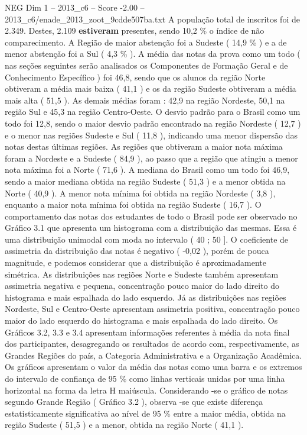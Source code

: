 \begin{textsample}{NEG Dim 1 – 2013\_c6 – Score -2.00 – 2013\_c6/enade\_2013\_zoot\_9cdde507ba.txt}
A população total de inscritos foi de 2.349.
Destes, 2.109 \textbf{estiveram} presentes, sendo 10,2 \% o índice de não comparecimento.
A Região de maior abstenção foi a Sudeste ( 14,9 \% ) e a de menor abstenção foi a Sul ( 4,3 \% ).
A média das notas da prova como um todo ( nas seções seguintes serão analisados os Componentes de Formação Geral e de Conhecimento Específico ) foi 46,8, sendo que os alunos da região Norte obtiveram a média mais baixa ( 41,1 ) e os da região Sudeste obtiveram a média mais alta ( 51,5 ).
As demais médias foram : 42,9 na região Nordeste, 50,1 na região Sul e 45,3 na região Centro-Oeste.
O desvio padrão para o Brasil como um todo foi 12,8, sendo o maior desvio padrão encontrado na região Nordeste ( 12,7 ) e o menor nas regiões Sudeste e Sul ( 11,8 ), indicando uma menor dispersão das notas destas últimas regiões.
As regiões que obtiveram a maior nota máxima foram a Nordeste e a Sudeste ( 84,9 ), ao passo que a região que atingiu a menor nota máxima foi a Norte ( 71,6 ).
A mediana do Brasil como um todo foi 46,9, sendo a maior mediana obtida na região Sudeste ( 51,3 ) e a menor obtida na Norte ( 40,9 ).
A menor nota mínima foi obtida na região Nordeste ( 3,8 ), enquanto a maior nota mínima foi obtida na região Sudeste ( 16,7 ).
O comportamento das notas dos estudantes de todo o Brasil pode ser observado no Gráfico 3.1 que apresenta um histograma com a distribuição das mesmas.
Essa é uma distribuição unimodal com moda no intervalo ( 40 ; 50 ].
O coeficiente de assimetria da distribuição das notas é negativo ( -0,02 ), porém de pouca magnitude, e podemos considerar que a distribuição é aproximadamente simétrica.
As distribuições nas regiões Norte e Sudeste também apresentam assimetria negativa e pequena, concentração pouco maior do lado direito do histograma e mais espalhada do lado esquerdo.
Já as distribuições nas regiões Nordeste, Sul e Centro-Oeste apresentam assimetria positiva, concentração pouco maior do lado esquerdo do histograma e mais espalhada do lado direito.
Os Gráficos 3.2, 3.3 e 3.4 apresentam informações referentes à média da nota final dos participantes, desagregando os resultados de acordo com, respectivamente, as Grandes Regiões do país, a Categoria Administrativa e a Organização Acadêmica.
Os gráficos apresentam o valor da média das notas como uma barra e os extremos do intervalo de confiança de 95 \% como linhas verticais unidas por uma linha horizontal na forma da letra H maiúscula.
Considerando -se o gráfico de notas segundo Grande Região ( Gráfico 3.2 ), observa -se que existe diferença estatisticamente significativa ao nível de 95 \% entre a maior média, obtida na região Sudeste ( 51,5 ) e a menor, obtida na região Norte ( 41,1 ).

\end{textsample}
